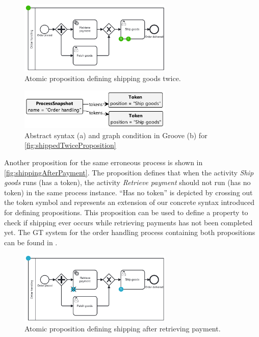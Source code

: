 \documentclass{lmcs} %
\begin{document}
\begin{figure}[ht]
    \centering
    \includegraphics[width=0.65\textwidth]{images/shippedTwiceProposition.pdf}
    \caption{Atomic proposition defining shipping goods twice.}
    \label{fig:shippedTwiceProposition}
\end{figure}

\begin{figure}[ht]
    \centering
    \includegraphics[width=0.65\textwidth]{images/twice.pdf}
    \caption{Abstract syntax (a) and graph condition in Groove (b) for \autoref{fig:shippedTwiceProposition}}
    \label{fig:shippedTwiceAbstractAndGroove}
\end{figure}

Another proposition for the same erroneous process is shown in \autoref{fig:shippingAfterPayment}.
The proposition defines that when the activity \textit{Ship goods} runs (has a token), the activity \textit{Retrieve payment} should not run (has no token) in the same process instance.
\enquote{Has no token} is depicted by crossing out the token symbol and represents an extension of our concrete syntax introduced for defining propositions.
This proposition can be used to define a property to check if shipping ever occurs while retrieving payments has not been completed yet.
The GT system for the order handling process containing both propositions can be found in \cite{timkrauterLMCS2024Artifacts2023}.

\begin{figure}[ht]
    \centering
    \includegraphics[width=0.65\textwidth]{images/shippingAfterPayment.pdf}
    \caption{Atomic proposition defining shipping after retrieving payment.}
    \label{fig:shippingAfterPayment}
\end{figure}
\end{document}

